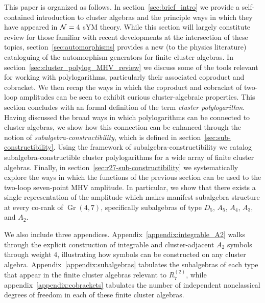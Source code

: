 \documentclass[11pt]{article}
\DeclareMathOperator{\Gr}{Gr}
\begin{document}
This paper is organized as follows. In section~\ref{sec:brief_intro} we provide a self-contained introduction to cluster algebras and the principle ways in which they have appeared in ${\cal N} =4$ sYM theory. While this section will largely constitute review for those familiar with recent developments at the intersection of these topics, section~\ref{sec:automorphisms} provides a new (to the physics literature) cataloguing of the automorphism generators for finite cluster algebras. In section~\ref{sec:cluster_polylog_MHV_review} we discuss some of the tools relevant for working with polylogarithms, particularly their associated coproduct and cobracket. We then recap the ways in which the coproduct and cobracket of two-loop amplitudes can be seen to exhibit curious cluster-algebraic properties. This section concludes with an formal definition of the term \emph{cluster polylogarithm}. Having discussed the broad ways in which polylogarithms can be connected to cluster algebras, we show how this connection can be enhanced through the notion of \emph{subalgebra-constructibility}, which is defined in section~\ref{sec:sub-constructibility}. Using the framework of subalgebra-constructibility we catalog subalgebra-constructible cluster polylogarithms for a wide array of finite cluster algebras. Finally, in section~\ref{sec:r27-sub-constructibility} we systematically explore the ways in which the functions of the previous section can be used to the two-loop seven-point MHV amplitude. In particular, we show that there exists a single representation of the amplitude which makes manifest subalgebra structure at every co-rank of $\Gr(4,7)$, specifically subalgebras of type $D_5$, $A_5$, $A_4$, $A_3$, and $A_2$. 

We also include three appendices. Appendix~\ref{appendix:integrable_A2} walks through the explicit construction of integrable and cluster-adjacent $A_2$ symbols through weight 4, illustrating how symbols can be constructed on any cluster algebra. Appendix~\ref{appendix:subalgebras} tabulates the subalgebras of each type that appear in the finite cluster algebras relevant to $R_7^{(2)}$, while appendix~\ref{appendix:cobrackets} tabulates the number of independent nonclassical degrees of freedom in each of these finite cluster algebras.


\end{document}
